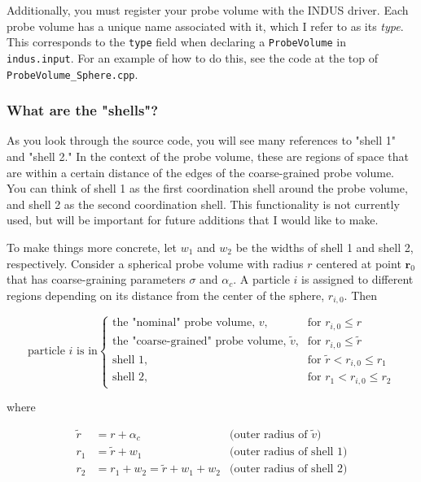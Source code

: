 \documentclass[11pt,notitlepage]{article}
\begin{document}
Additionally, you must register your probe volume with the INDUS driver. Each probe volume has a unique name associated with it, which I refer to as its \emph{type}. This corresponds to the \texttt{type} field when declaring a \texttt{ProbeVolume} in \texttt{indus.input}. For an example of how to do this, see the code at the top of \texttt{ProbeVolume\_Sphere.cpp}.


\subsubsection{What are the "shells"?}

As you look through the source code, you will see many references to "shell 1" and "shell 2." In the context of the probe volume, these are regions of space that are within a certain distance of the edges of the coarse-grained probe volume. You can think of shell 1 as the first coordination shell around the probe volume, and shell 2 as the second coordination shell. This functionality is not currently used, but will be important for future additions that I would like to make.


To make things more concrete, let $w_1$ and $w_2$ be the widths of shell 1 and shell 2, respectively. Consider a spherical probe volume with radius $r$ centered at point $\mathbf{r}_0$ that has coarse-graining parameters $\sigma$ and $\alpha_c$. A particle $i$ is assigned to different regions depending on its distance from the center of the sphere, $r_{i,0}$. Then

\begin{equation}
	\text{particle $i$ is in}
	\begin{cases}
		\text{the "nominal" probe volume, $v$,}
			& \text{for } r_{i,0} \leq r \\
		\text{the "coarse-grained" probe volume, $\tilde{v}$,}
			& \text{for } r_{i,0} \leq \tilde{r} \\
		\text{shell 1,}
			& \text{for } \tilde{r} < r_{i,0} \leq r_1 \\
		\text{shell 2,}
			& \text{for } r_1 < r_{i,0} \leq r_2
	\end{cases}
\end{equation}

\noindent where

\begin{align}
	\tilde{r} &= r + \alpha_c                       & \text{(outer radius of $\tilde{v}$)} \\
	r_1       &= \tilde{r} + w_1                    & \text{(outer radius of shell 1)} \\
	r_2       &= r_1 + w_2 = \tilde{r} + w_1 + w_2  & \text{(outer radius of shell 2)}
\end{align}
\end{document}
